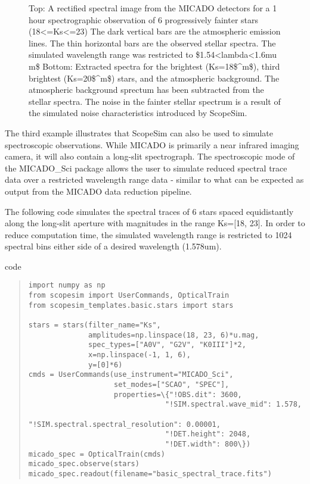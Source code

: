 \begin{figure}[H]
\noindent{}\label{fig-example-3-spectra}

\caption{Top: A rectified spectral image from the MICADO detectors for a 1 hour spectrographic observation of 6 progressively fainter stars (18<=Ks<=23)
The dark vertical bars are the atmospheric emission lines.
The thin horizontal bars are the observed stellar spectra.
The simulated wavelength range was restricted to \$1.54<lambda<1.6mu m\$
Bottom: Extracted spectra for the brightest (Ks=18\$\textasciicircum{}m\$), third brightest (Ks=20\$\textasciicircum{}m\$) stars, and the atmospheric background.
The atmospheric background sprectum has been subtracted from the stellar spectra.
The noise in the fainter stellar spectrum is a result of the simulated noise characteristics introduced by ScopeSim.}
\end{figure}

The third example illustrates that ScopeSim can also be used to simulate spectroscopic observations.
While MICADO is primarily a near infrared imaging camera, it will also contain a long-slit spectrograph.
The spectroscopic mode of the MICADO\_Sci package allows the user to simulate reduced spectral trace data over a restricted wavelength range data - similar to what can be expected as output from the MICADO data reduction pipeline.

The following code simulates the spectral traces of 6 stars spaced equidistantly along the long-slit aperture with magnitudes in the range Ks={[}18, 23{]}.
In order to reduce computation time, the simulated wavelength range is restricted to 1024 spectral bins either side of a desired wavelength (1.578um).

\label{code-example-3-spectra}
\begin{DUclass}{code}
\begin{quote}
\begin{alltt}
\begin{lstlisting}[frame=single]
import numpy as np
from scopesim import UserCommands, OpticalTrain
from scopesim_templates.basic.stars import stars

stars = stars(filter_name="Ks",
              amplitudes=np.linspace(18, 23, 6)*u.mag,
              spec_types=["A0V", "G2V", "K0III"]*2,
              x=np.linspace(-1, 1, 6),
              y=[0]*6)
cmds = UserCommands(use_instrument="MICADO_Sci",
                    set_modes=["SCAO", "SPEC"],
                    properties=\{"!OBS.dit": 3600,
                                "!SIM.spectral.wave_mid": 1.578,
                                "!SIM.spectral.spectral_resolution": 0.00001,
                                "!DET.height": 2048,
                                "!DET.width": 800\})
micado_spec = OpticalTrain(cmds)
micado_spec.observe(stars)
micado_spec.readout(filename="basic_spectral_trace.fits")
\end{lstlisting}
\end{alltt}
\end{quote}
\end{DUclass}

